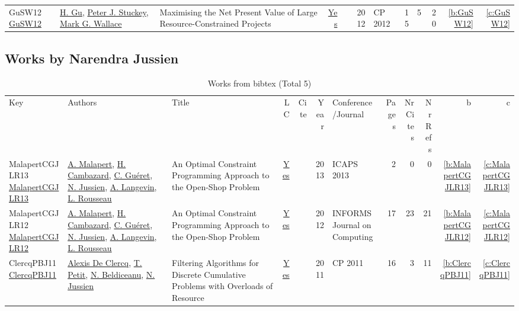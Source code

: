 {\begin{longtable}{>{\raggedright\arraybackslash}p{3cm}>{\raggedright\arraybackslash}p{6cm}>{\raggedright\arraybackslash}p{6.5cm}rrrp{2.5cm}rrrrr}
GuSW12 \href{https://doi.org/10.1007/978-3-642-33558-7\_55}{GuSW12} & \hyperref[auth:a342]{H. Gu}, \hyperref[auth:a126]{Peter J. Stuckey}, \hyperref[auth:a156]{Mark G. Wallace} & Maximising the Net Present Value of Large Resource-Constrained Projects & \href{works/GuSW12.pdf}{Yes} & \cite{GuSW12} & 2012 & CP 2012 & 15 & 5 & 20 & \ref{b:GuSW12} & \ref{c:GuSW12}\\
\end{longtable}
}

\subsection{Works by Narendra Jussien}
\label{sec:a250}
{\scriptsize
\begin{longtable}{>{\raggedright\arraybackslash}p{3cm}>{\raggedright\arraybackslash}p{6cm}>{\raggedright\arraybackslash}p{6.5cm}rrrp{2.5cm}rrrrr}
\rowcolor{white}\caption{Works from bibtex (Total 5)}\\ \toprule
\rowcolor{white}Key & Authors & Title & LC & Cite & Year & \shortstack{Conference\\/Journal} & Pages & \shortstack{Nr\\Cites} & \shortstack{Nr\\Refs} & b & c \\ \midrule\endhead
\bottomrule
\endfoot
MalapertCGJLR13 \href{http://www.aaai.org/ocs/index.php/ICAPS/ICAPS13/paper/view/6016}{MalapertCGJLR13} & \hyperref[auth:a82]{A. Malapert}, \hyperref[auth:a1025]{H. Cambazard}, \hyperref[auth:a296]{C. Gu{\'{e}}ret}, \hyperref[auth:a250]{N. Jussien}, \hyperref[auth:a655]{A. Langevin}, \hyperref[auth:a332]{L. Rousseau} & An Optimal Constraint Programming Approach to the Open-Shop Problem & \href{works/MalapertCGJLR13.pdf}{Yes} & \cite{MalapertCGJLR13} & 2013 & ICAPS 2013 & 2 & 0 & 0 & \ref{b:MalapertCGJLR13} & \ref{c:MalapertCGJLR13}\\
MalapertCGJLR12 \href{https://doi.org/10.1287/ijoc.1100.0446}{MalapertCGJLR12} & \hyperref[auth:a82]{A. Malapert}, \hyperref[auth:a1025]{H. Cambazard}, \hyperref[auth:a296]{C. Gu{\'{e}}ret}, \hyperref[auth:a250]{N. Jussien}, \hyperref[auth:a655]{A. Langevin}, \hyperref[auth:a332]{L. Rousseau} & An Optimal Constraint Programming Approach to the Open-Shop Problem & \href{works/MalapertCGJLR12.pdf}{Yes} & \cite{MalapertCGJLR12} & 2012 & INFORMS Journal on Computing & 17 & 23 & 21 & \ref{b:MalapertCGJLR12} & \ref{c:MalapertCGJLR12}\\
ClercqPBJ11 \href{https://doi.org/10.1007/978-3-642-23786-7\_20}{ClercqPBJ11} & \hyperref[auth:a249]{Alexis De Clercq}, \hyperref[auth:a227]{T. Petit}, \hyperref[auth:a129]{N. Beldiceanu}, \hyperref[auth:a250]{N. Jussien} & Filtering Algorithms for Discrete Cumulative Problems with Overloads of Resource & \href{works/ClercqPBJ11.pdf}{Yes} & \cite{ClercqPBJ11} & 2011 & CP 2011 & 16 & 3 & 11 & \ref{b:ClercqPBJ11} & \ref{c:ClercqPBJ11}\\

\end{longtable}}
